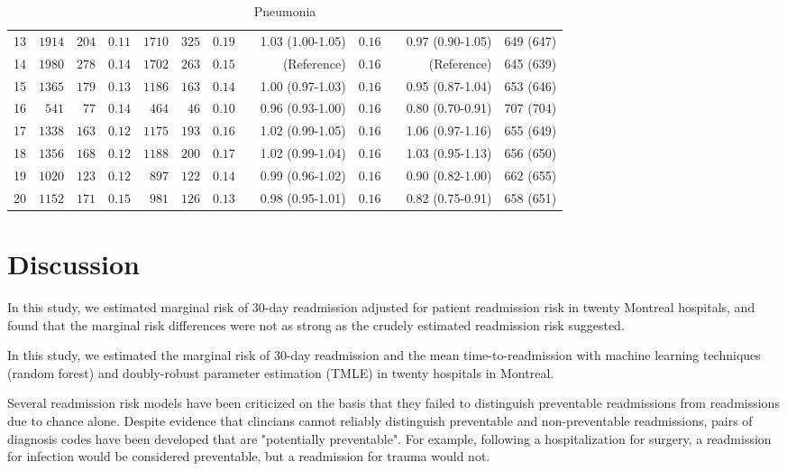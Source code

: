 \documentclass[]{article}\usepackage[]{graphicx}\usepackage[]{color}
\begin{document}
\begin{landscape}
\begin{table}[!tbp]
\begin{center}
\begin{tabular}{lrrrrrrcrrcrr}
13&$1914$&$204$&$0.11$&$1710$&$325$&$0.19$&&1.03 (1.00-1.05)&$0.16$&&0.97 (0.90-1.05)&649 (647)\tabularnewline
14&$1980$&$278$&$0.14$&$1702$&$263$&$0.15$&&(Reference)&$0.16$&&(Reference)&645 (639)\tabularnewline
15&$1365$&$179$&$0.13$&$1186$&$163$&$0.14$&&1.00 (0.97-1.03)&$0.16$&&0.95 (0.87-1.04)&653 (646)\tabularnewline
16&$ 541$&$ 77$&$0.14$&$ 464$&$ 46$&$0.10$&&0.96 (0.93-1.00)&$0.16$&&0.80 (0.70-0.91)&707 (704)\tabularnewline
17&$1338$&$163$&$0.12$&$1175$&$193$&$0.16$&&1.02 (0.99-1.05)&$0.16$&&1.06 (0.97-1.16)&655 (649)\tabularnewline
18&$1356$&$168$&$0.12$&$1188$&$200$&$0.17$&&1.02 (0.99-1.04)&$0.16$&&1.03 (0.95-1.13)&656 (650)\tabularnewline
19&$1020$&$123$&$0.12$&$ 897$&$122$&$0.14$&&0.99 (0.96-1.02)&$0.16$&&0.90 (0.82-1.00)&662 (655)\tabularnewline
20&$1152$&$171$&$0.15$&$ 981$&$126$&$0.13$&&0.98 (0.95-1.01)&$0.16$&&0.82 (0.75-0.91)&658 (651)\tabularnewline
\hline
\end{tabular}

\caption{Pneumonia\label{pre.format}}\end{center}

\end{table}


\setmainfont[Scale=1.25]{Cambria}
\linespread{1.25}


\end{landscape}
\section{Discussion}
In this study, we estimated marginal risk of 30-day readmission adjusted for patient readmission risk in twenty Montreal hospitals, and found that the marginal risk differences were not as strong as the crudely estimated readmission risk suggested. 

In this study, we estimated the marginal risk of 30-day readmission and the mean time-to-readmission with machine learning techniques (random forest) and doubly-robust parameter estimation (TMLE) in twenty hospitals in Montreal.

Several readmission risk models have been criticized on the basis that they failed to distinguish preventable readmissions from readmissions due to chance alone. Despite evidence that clincians cannot reliably distinguish preventable and non-preventable readmissions, pairs of diagnosis codes have been developed that are "potentially preventable". For example, following a hospitalization for surgery, a readmission for infection would be considered preventable, but a readmission for trauma would not.
\end{document}

